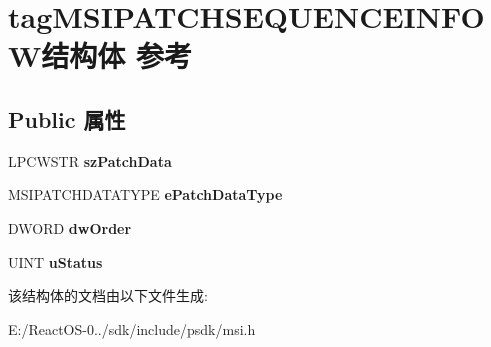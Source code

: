 \hypertarget{structtag_m_s_i_p_a_t_c_h_s_e_q_u_e_n_c_e_i_n_f_o_w}{}\section{tag\+M\+S\+I\+P\+A\+T\+C\+H\+S\+E\+Q\+U\+E\+N\+C\+E\+I\+N\+F\+O\+W结构体 参考}
\label{structtag_m_s_i_p_a_t_c_h_s_e_q_u_e_n_c_e_i_n_f_o_w}
\subsection*{Public 属性}
\begin{DoxyCompactItemize}
\item 
\mbox{\label{structtag_m_s_i_p_a_t_c_h_s_e_q_u_e_n_c_e_i_n_f_o_w_a0e82bf43057cba3a022b3e20be778f0d}} 
L\+P\+C\+W\+S\+TR {\bfseries sz\+Patch\+Data}
\item 
\mbox{\label{structtag_m_s_i_p_a_t_c_h_s_e_q_u_e_n_c_e_i_n_f_o_w_a11852d1ee0b006251a4fe6fb10ecdc06}} 
M\+S\+I\+P\+A\+T\+C\+H\+D\+A\+T\+A\+T\+Y\+PE {\bfseries e\+Patch\+Data\+Type}
\item 
\mbox{\label{structtag_m_s_i_p_a_t_c_h_s_e_q_u_e_n_c_e_i_n_f_o_w_a6d6a4f470bb06b107e31a435fd31a08b}} 
D\+W\+O\+RD {\bfseries dw\+Order}
\item 
\mbox{\label{structtag_m_s_i_p_a_t_c_h_s_e_q_u_e_n_c_e_i_n_f_o_w_a0366cf661a462bc55afef3263ce43ef5}} 
U\+I\+NT {\bfseries u\+Status}
\end{DoxyCompactItemize}


该结构体的文档由以下文件生成\+:\begin{DoxyCompactItemize}
\item 
E\+:/\+React\+O\+S-\/0../sdk/include/psdk/msi.\+h\end{DoxyCompactItemize}
